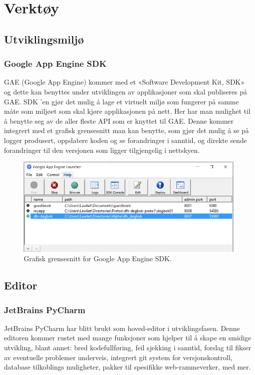 \chapter{Verktøy}

\section{Utviklingsmiljø}
\subsection{Google App Engine SDK}
GAE (Google App Engine) kommer med et «Software Development Kit, SDK» og dette kan benyttes under utviklingen av applikasjoner som skal publiseres på GAE. SDK ’en gjør det mulig å lage et virtuelt miljø som fungerer på samme måte som miljøet som skal kjøre applikasjonen på nett. Her har man mulighet til å benytte seg av de aller fleste API som er knyttet til GAE. Denne kommer integrert med et grafisk grensesnitt man kan benytte, som gjør det mulig å se på logger produsert, oppdatere koden og se forandringer i sanntid, og direkte sende forandringer til den versjonen som ligger tilgjengelig i nettskyen.	  


 \begin{figure}[htbp]
	\centering
		\includegraphics[scale=1.0]{gaesdk.png}
	\caption[Google App Engine SDK]{Grafisk grensesnitt for Google App Engine SDK.}
	\label{fig:gaesdk}
\end{figure}


\section{Editor}
\subsection{JetBrains PyCharm}
JetBrains PyCharm har blitt brukt som hoved-editor i utviklingsfasen. Denne editoren kommer rustet med mange funksjoner som hjelper til å skape en smidige utvikling, blant annet: bred kodefullføring, feil sjekking i sanntid, forslag til fikser av eventuelle problemer underveis, integrert git system for versjonskontroll, database tilkoblings muligheter, pakker til spesifikke web-rammeverker, med mer. 

